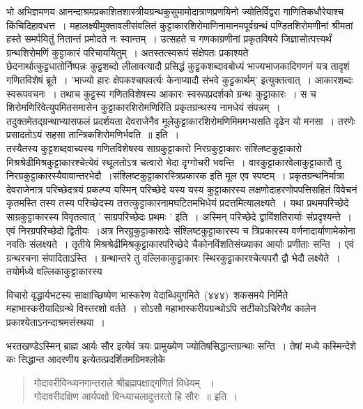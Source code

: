 \documentclass[11pt, openany]{book}
\begin{document}
\newpage
\thispagestyle{fancy}
\fancyhf{}

\justifying
\indent
भो अभिज्ञमणय आनन्दाश्रमप्रकाशितशास्त्रीयग्रन्थकुसुमामोदात्राणप्रणयिनो ज्योतिर्विद्वरा गाणितिकधौरेयाश्च किंचिदिहावधत्त~। महालक्ष्यीमुक्तावलीसंवलितं कुट्टाकारशिरोमाणिनामानमपूर्वग्रन्थं पण्डितशिरोमणीनां श्रीमतां हस्ते समर्पयितुं नितान्तं प्रमोदते नः स्वान्तम्~। उत्सहते च गणकाग्रणीनां प्रकृतविषये जिज्ञासोत्पत्त्यर्थं ग्रन्थशिरोमणिं कुट्टाकारं परिचाययितुम्~। अतस्तत्स्वरूपं संक्षेपतः प्रकाश्यते\textendash\\

\indent
छेदनार्थात्कुट्टधातोर्निष्पन्नः कुट्टशब्दो लीलावत्यादौ प्रसिद्धं कुट्टकशब्दावबोध्यं भाज्यभाजकादिगणनं यत्र तादृशं गणितविशेषं ब्रूते~। 'भाज्यो हारः क्षेपकश्चापवर्त्यः केनाप्यादौ संभवे कुट्टकार्थम्' इत्युक्तत्वात्~। आकारशब्दः स्वरूपवचनः~। तथाच कुट्टस्य गणितविशेषस्य आकारः स्वरूपप्रदर्शको ग्रन्थः कुट्टाकारः~। स च शिरोमणिरिवेत्युपमितसमासेन कुट्टाकारशिरोमणिरिति प्रकृतग्रन्थस्य नामधेयं संपन्नम्~। तदुक्तमेतद्ग्रन्थाभ्यासफलं प्रदर्शयता देवराजेनैव मूले\textendash  कुट्टाकारशिरोमणिमिममभ्यसति दृढेन यो मनसा~। तरणेः प्रसादतोऽयं सहसा तान्त्रिकशिरोमणिर्भवति~॥ इति~।\\

\indent
तस्यैतस्य कुट्टशब्दवाच्यस्य गणितविशेषस्य साग्रकुट्टाकारो निरग्रकुट्टाकारः संश्लिष्टकुट्टाकारो मिश्रश्रेढीमिश्रकुट्टाकारश्चेत्येवं स्थूलतोऽत्र चत्वारो भेदा दृग्गोचरी भवन्ति~। वारकुट्टाकारवेलाकुट्टाकारौ तु निरग्रकुट्टाकारस्यैवावान्तरभेदौ~।संश्लिष्टकुट्टाकारस्त्रिप्रकारक इति मूल एव स्पष्टम्~। प्रकृतग्रन्थनिर्मात्रा देवराजेनात्र परिच्छेदत्रयं प्रकल्प्य यस्मिन् परिच्छेदे यस्य यस्य कुट्टाकारस्य लक्षणोदाहरणोपपत्तिसहितं विवेचनं कृतमस्ति तस्य तस्य परिच्छेदस्य तत्तत्कुट्टाकारनामघटितमभिधेयं प्रदत्तमित्यालक्ष्यते~। यथा प्रथमपरिच्छेदे साग्रकुट्टाकारस्य विवृतत्वात् ' साग्रपरिच्छेदः प्रथमः ' इति~। अस्मिन् परिच्छेदे द्वाविंशतिरार्याः संप्रदृश्यन्ते~। एवं निरग्रपरिच्छेदो द्वितीयः~।अत्र निरग्रुकुट्टाकारादेः संश्लिष्टकुट्टाकारस्य च त्रिप्रकारस्य वर्णनादार्याणामेकोना नवतिः संलक्ष्यते~। तृतीये मिश्रश्रेढीमिश्रकुट्टाकारपरिच्छेदे चैकोनविंशतिसंख्याका आर्याः प्रणीताः सन्ति~। एवं ग्रन्थरचना संपादिताऽस्ति~। ग्रन्थान्तरे तु वल्लिकाकुट्टाकारः स्थिरकुट्टाकारश्चेत्यपरौ द्वौ भेदौ लक्ष्येते~। तयोर्मध्ये वल्लिकाकुट्टाकारस्य

\newpage
\thispagestyle{fancy}
\fancyhf{}
\chead{\textbf{[२]}}

\noindent विचारो वृद्धार्यभटस्य साक्षाच्छिष्येण भास्करेण वेदाब्धियुगमिते~(४४४)~शकसमये निर्मिते महाभास्करीयादिग्रन्थे विस्तरशो वर्तते~। सोऽसौ महाभास्करीयग्रन्थोऽपि सटीकोऽचिरेणैव कालेन प्रकाश्येताऽनन्दाश्रमसंस्थया~।\\
\begin{sloppypar} 
\indent भरतखण्डेऽस्मिन् ब्राह्म आर्यः सौर इत्येवं त्रयः प्रामुख्येण ज्योतिषसिद्धान्तग्रन्थाः सन्ति~। तेषां मध्ये कस्मिन्देशे कः सिद्धान्त आदरणीय इत्येतत्प्रदर्शितमग्रिमश्लोके\textendash
\end{sloppypar}
\begin{quote}
{\qt गोदावरीविन्ध्यनगान्तराले श्रीब्रह्मपक्षाद्गणितं विधेयम् ~।\\
गोदावरीदक्षिण आर्यपक्षो विन्ध्याचलादुत्तरतो हि सौरः~॥} इति~।
\end{quote}
\end{document}
